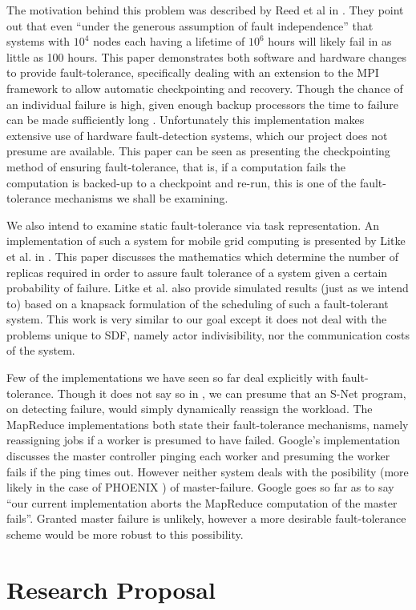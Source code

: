 The motivation behind this problem was described by Reed et al in \cite{ree06}.
They point out that even ``under the generous assumption of fault independence'' that systems with $10^4$ nodes each having a lifetime of $10^6$ hours will likely fail in as little as 100 hours.
This paper demonstrates both software and hardware changes to provide fault-tolerance, specifically dealing with an extension to the MPI framework to allow automatic checkpointing and recovery.
Though the chance of an individual failure is high, given enough backup processors the time to failure can be made sufficiently long \cite{ree06}.
Unfortunately this implementation makes extensive use of hardware fault-detection systems, which our project does not presume are available.
This paper can be seen as presenting the checkpointing method of ensuring fault-tolerance, that is, if a computation fails the computation is backed-up to a checkpoint and re-run, this is one of the fault-tolerance mechanisms we shall be examining.

We also intend to examine static fault-tolerance via task representation.
An implementation of such a system for mobile grid computing is presented by Litke et al. in \cite{lit07}.
This paper discusses the mathematics which determine the number of replicas required in order to assure fault tolerance of a system given a certain probability of failure.
Litke et al. also provide simulated results (just as we intend to) based on a knapsack formulation of the scheduling of such a fault-tolerant system.
This work is very similar to our goal except it does not deal with the problems unique to SDF, namely actor indivisibility, nor the communication costs of the system.

Few of the implementations we have seen so far deal explicitly with fault-tolerance.
Though it does not say so in \cite{pen09}, we can presume that an S-Net program, on detecting failure, would simply dynamically reassign the workload.
The MapReduce implementations \cite{dea08, ran07} both state their fault-tolerance mechanisms, namely reassigning jobs if a worker is presumed to have failed.
Google's implementation discusses the master controller pinging each worker and presuming the worker fails if the ping times out.
However neither system deals with the posibility (more likely in the case of PHOENIX \cite{ran07}) of master-failure.
Google goes so far as to say ``our current implementation aborts the MapReduce computation of the master fails''.
Granted master failure is unlikely, however a more desirable fault-tolerance scheme would be more robust to this possibility.

\section*{Research Proposal}





